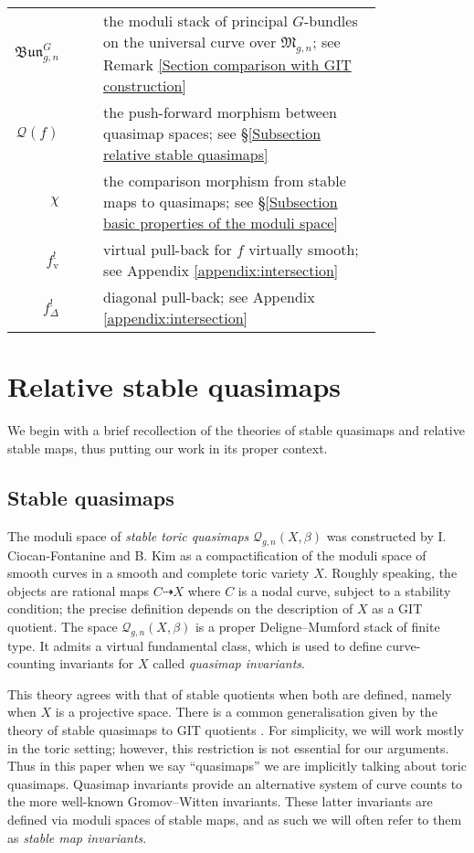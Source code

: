\documentclass[10pt]{amsart}
\newcommand{\Q}[4]{\mathcal{Q}_{#1,#2}(#3,#4)}
\newcommand{\MM}{\mathfrak M}
\newcommand{\om}[1]{\mathcal{#1}}
\theoremstyle{definition}
\theoremstyle{definition}
\newcommand{\ilemph}[1]{\emph{#1}}
\begin{document}
\begin{tabu}{r c c p{0.8\linewidth}}
$\mathfrak{Bun}^{G}_{g,n}$ & & & the moduli stack of principal $G$-bundles on the universal curve over $\MM_{g,n}$; see Remark \ref{Section comparison with GIT construction} \\
$\om{Q}(f)$ & & & the push-forward morphism between quasimap spaces; see \S \ref{Subsection relative stable quasimaps} \\
$\chi$ & & & the comparison morphism from stable maps to quasimaps; see \S \ref{Subsection basic properties of the moduli space} \\
$f^!_{\text{v}}$ & & & virtual pull-back for $f$ virtually smooth; see Appendix \ref{appendix:intersection} \\
$f^!_{\Delta}$ & & & diagonal pull-back; see Appendix \ref{appendix:intersection}
\end{tabu}
\section{Relative stable quasimaps} \label{Section relative stable quasimaps}
We begin with a brief recollection of the theories of stable quasimaps and relative stable maps, thus putting our work in its proper context.
\subsection{Stable quasimaps}\label{subsection quasimaps}
The moduli space of \ilemph{stable toric quasimaps} $\Q{g}{n}{X}{\beta}$ was constructed by I. Ciocan-Fontanine and B. Kim \cite{CF-K} as a compactification of the moduli space of smooth curves in a smooth and complete toric variety $X$. Roughly speaking, the objects are rational maps $C \dashrightarrow X$ where $C$ is a nodal curve, subject to a stability condition; the precise definition depends on the description of $X$ as a GIT quotient.  The space $\Q{g}{n}{X}{\beta}$ is a proper Deligne--Mumford stack of finite type.  It admits a virtual fundamental class, which is used to define curve-counting invariants for $X$ called \ilemph{quasimap invariants}.

This theory agrees with that of stable quotients \cite{MOP} when both are defined, namely when $X$ is a projective space.  There is a common generalisation given by the theory of stable quasimaps to GIT quotients \cite{CFKM}. For simplicity, we will work mostly in the toric setting; however, this restriction is not essential for our arguments. Thus in this paper when we say ``quasimaps'' we are implicitly talking about toric quasimaps.
Quasimap invariants provide an alternative system of curve counts to the more well-known Gromov--Witten invariants. These latter invariants are defined via moduli spaces of stable maps, and as such we will often refer to them as \emph{stable map invariants}.
\end{document}
